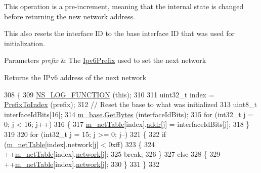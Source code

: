 This operation is a pre-\/increment, meaning that the internal state is changed before returning the new network address.

This also resets the interface ID to the base interface ID that was used for initialization.


\begin{DoxyParams}{Parameters}
{\em prefix} & The \hyperlink{classns3_1_1Ipv6Prefix}{Ipv6\+Prefix} used to set the next network \\
\hline
\end{DoxyParams}
\begin{DoxyReturn}{Returns}
the I\+Pv6 address of the next network 
\end{DoxyReturn}

\begin{DoxyCode}
308 \{
309   \hyperlink{log-macros-disabled_8h_a90b90d5bad1f39cb1b64923ea94c0761}{NS\_LOG\_FUNCTION} (\textcolor{keyword}{this});
310 
311   uint32\_t index = \hyperlink{classns3_1_1Ipv6AddressGeneratorImpl_a0dbdd6e1547463c189a0e82251557e44}{PrefixToIndex} (prefix);
312   \textcolor{comment}{// Reset the base to what was initialized}
313   uint8\_t interfaceIdBits[16];
314   \hyperlink{classns3_1_1Ipv6AddressGeneratorImpl_a1e53eb1183330c04ef0a0d81e3a3c21e}{m\_base}.\hyperlink{classns3_1_1Ipv6Address_ab0584d5f11901b3a560be98afe358648}{GetBytes} (interfaceIdBits);
315   \textcolor{keywordflow}{for} (int32\_t j = 0; j < 16; j++)
316     \{
317       \hyperlink{classns3_1_1Ipv6AddressGeneratorImpl_a4b742848bb716936009880a429664323}{m\_netTable}[index].\hyperlink{classns3_1_1Ipv6AddressGeneratorImpl_1_1NetworkState_ac4a604c7422c65bab24ad2dc003d0316}{addr}[j] = interfaceIdBits[j];
318     \}
319 
320   \textcolor{keywordflow}{for} (int32\_t j = 15; j >= 0; j--)
321     \{
322       \textcolor{keywordflow}{if} (\hyperlink{classns3_1_1Ipv6AddressGeneratorImpl_a4b742848bb716936009880a429664323}{m\_netTable}[index].network[j] < 0xff)
323         \{
324           ++\hyperlink{classns3_1_1Ipv6AddressGeneratorImpl_a4b742848bb716936009880a429664323}{m\_netTable}[index].\hyperlink{classns3_1_1Ipv6AddressGeneratorImpl_1_1NetworkState_ac84710d199384c02e953fd604fe34cee}{network}[j];
325           \textcolor{keywordflow}{break};
326         \}
327       \textcolor{keywordflow}{else}
328         \{
329           ++\hyperlink{classns3_1_1Ipv6AddressGeneratorImpl_a4b742848bb716936009880a429664323}{m\_netTable}[index].\hyperlink{classns3_1_1Ipv6AddressGeneratorImpl_1_1NetworkState_ac84710d199384c02e953fd604fe34cee}{network}[j];
330         \}
331     \}
332 

\end{DoxyCode}
